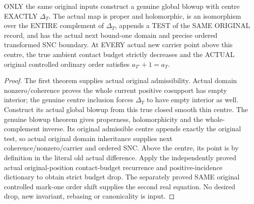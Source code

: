 \begin{theorem}
\label{hir:sharp-original-curve-whole-ambient-difference-blowup}
\leanok
ONLY the same original inputs construct a genuine global blowup with
centre EXACTLY $\Delta_T$. The actual map is proper and holomorphic,
is an isomorphism over the ENTIRE complement of $\Delta_T$, appends a
TEST of the SAME ORIGINAL record, and has the actual next bound-one
domain and precise ordered transformed SNC boundary. At EVERY actual
new carrier point above this centre, the true ambient contact budget
strictly decreases and the ACTUAL original controlled ordinary order
satisfies $a_{T'}+1=a_T$.
\end{theorem}
\begin{proof}
The first theorem supplies actual original admissibility. Actual domain
nonzero/coherence proves the whole current positive cosupport has empty
interior; the genuine centre inclusion forces $\Delta_T$ to have empty
interior as well. Construct its actual global blowup from this true
closed smooth thin centre. The genuine blowup theorem gives properness,
holomorphicity and the whole-complement inverse. Its original admissible
centre appends exactly the original test, so actual original domain
inheritance supplies next coherence/nonzero/carrier and ordered SNC.
Above the centre, its point is by definition in the literal old actual
difference. Apply the independently proved actual original-position
contact-budget recurrence and positive-incidence dictionary to obtain
strict budget drop. The separately proved SAME original controlled
mark-one order shift supplies the second real equation. No desired drop,
new invariant, rebasing or canonicality is input.
\end{proof}

